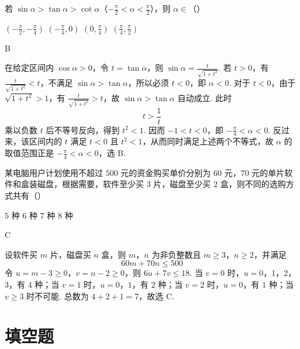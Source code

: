 \documentclass[UTF8,a4paper,oneside,11pt]{ctexbook}
\begin{document}
\begin{problem}
若 \(\sin\alpha>\tan\alpha>\cot\alpha\)（\(-\frac{\pi}{2}<\alpha<\frac{\pi}{2}\)），则 \(\alpha\in\)（\quad）

\choices
    {\(\left(-\frac{\pi}{2},-\frac{\pi}{4}\right)\)}
    {\(\left(-\frac{\pi}{4},0\right)\)}
    {\(\left(0,\frac{\pi}{4}\right)\)}
    {\(\left(\frac{\pi}{4},\frac{\pi}{2}\right)\)}
\end{problem}

\begin{answer}
B
\end{answer}

\begin{solution}
在给定区间内 \(\cos\alpha>0\)，令 \(t=\tan\alpha\)，则
\(\sin\alpha=\frac{t}{\sqrt{1+t^2}}\). 若 \(t>0\)，有
\(\frac{t}{\sqrt{1+t^2}}<t\)，不满足 \(\sin\alpha>\tan\alpha\)，所以必须 \(t<0\)，即 \(\alpha<0\). 对于 \(t<0\)，由于 \(\sqrt{1+t^2}>1\)，有
\(\frac{t}{\sqrt{1+t^2}}>t\)，故 \(\sin\alpha>\tan\alpha\) 自动成立. 此时
\[
t>\frac1t
\]
乘以负数 \(t\) 后不等号反向，得到 \(t^2<1\). 因而 \(-1<t<0\)，即
\(-\frac{\pi}{4}<\alpha<0\). 反过来，该区间内的 \(t\) 满足 \(t<0\) 且 \(t^2<1\)，从而同时满足上述两个不等式，故 \(\alpha\) 的取值范围正是 \(-\frac{\pi}{4}<\alpha<0\)，选 B.
\end{solution}

\begin{problem}
某电脑用户计划使用不超过 \(500\) 元的资金购买单价分别为 \(60\) 元，\(70\) 元的单片软件和盒装磁盘，根据需要，软件至少买 \(3\) 片，磁盘至少买 \(2\) 盒，则不同的选购方式共有（\quad）

\choices
    {\(5\) 种}
    {\(6\) 种}
    {\(7\) 种}
    {\(8\) 种}
\end{problem}

\begin{answer}
C
\end{answer}

\begin{solution}
设软件买 \(m\) 片，磁盘买 \(n\) 盒，则 \(m\)，\(n\) 为非负整数且
\(m\ge3\)，\(n\ge2\)，并满足
\[
60m+70n\le500
\]
令 \(u=m-3\ge0\)，\(v=n-2\ge0\)，则
\(6u+7v\le18\). 当 \(v=0\) 时，\(u=0\)，\(1\)，\(2\)，\(3\)，有 \(4\) 种；当 \(v=1\) 时，\(u=0\)，\(1\)，有 \(2\) 种；当 \(v=2\) 时，\(u=0\)，有 \(1\) 种；当 \(v\ge3\) 时不可能. 总数为 \(4+2+1=7\)，故选 C.
\end{solution}

\section{填空题}
\end{document}

